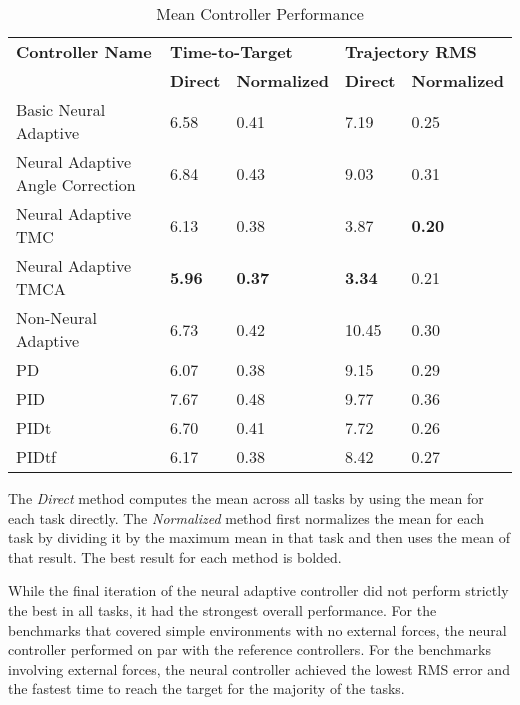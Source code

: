 \documentclass[letterpaper,12pt,titlepage,oneside,final]{book}
\begin{document}
\begin{table}
\begin{threeparttable}
\caption{Mean Controller Performance} \label{table:mean_task_ranking}
\begin{tabular}{| l | l | l | l | l |}
\hline
\textbf{Controller Name} & \multicolumn{2}{l|}{\textbf{Time-to-Target}} & \multicolumn{2}{l|}{\textbf{Trajectory RMS}} \\ \cline{2-5}
& \textbf{Direct} & \textbf{Normalized} & \textbf{Direct} & \textbf{Normalized} \\ \hline
Basic Neural Adaptive & 6.58 & 0.41 & 7.19 & 0.25 \\ \hline
Neural Adaptive Angle Correction & 6.84 & 0.43 & 9.03 & 0.31 \\ \hline
Neural Adaptive TMC & 6.13 & 0.38 & 3.87 & \textbf{0.20} \\ \hline
Neural Adaptive TMCA & \textbf{5.96} & \textbf{0.37} & \textbf{3.34} & 0.21 \\ \hline
Non-Neural Adaptive & 6.73 & 0.42 & 10.45 & 0.30 \\ \hline
PD & 6.07 & 0.38 & 9.15 & 0.29 \\ \hline
PID & 7.67 & 0.48 & 9.77 & 0.36 \\ \hline
PIDt & 6.70 & 0.41 & 7.72 & 0.26 \\ \hline
PIDtf & 6.17 & 0.38 & 8.42 & 0.27 \\ \hline
\end{tabular}
\begin{tablenotes}
\footnotesize
\item The \textit{Direct} method computes the mean across all tasks by using the mean for each task directly. The \textit{Normalized} method first normalizes the mean for each task by dividing it by the maximum mean in that task and then uses the mean of that result. The best result for each method is bolded.
\end{tablenotes}
\end{threeparttable}
\end{table}

While the final iteration of the neural adaptive controller did not perform strictly the best in all tasks, it had the strongest overall performance.
For the benchmarks that covered simple environments with no external forces, the neural controller performed on par with the reference controllers.
For the benchmarks involving external forces, the neural controller achieved the lowest RMS error and the fastest time to reach the target for the majority of the tasks.
 
\end{document}
